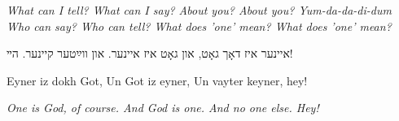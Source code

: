 \vspace{1em}

\begin{english}
{\itshape
What can I tell? 
What can I say?
About you? About you?
Yum-da-da-di-dum \\
Who can say? 
Who can tell?
What does 'one' mean?
What does 'one' mean?}
\end{english}

\begin{center}
איינער איז דאָך גאָט,
און גאָט איז איינער. 
און ווײַטער קיינער. הײ!

\begin{english}
Eyner iz dokh Got,
Un Got iz eyner,
Un vayter keyner, hey!

{\itshape One is God, of course. 
And God is one. 
And no one else. Hey!}
\end{english}
\end{center}

